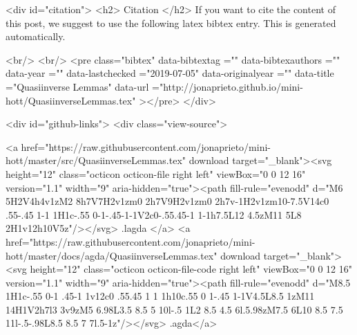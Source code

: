   
  <div id="citation">
  <h2> Citation </h2>
  If you want to cite the content of this post,
  we suggest to use the following latex bibtex entry.
  This is generated automatically.

  <br/>
  <br/>
  <pre class="bibtex"
       data-bibtextag =""
       data-bibtexauthors =""
       data-year =""
       data-lastchecked ="2019-07-05"
       data-originalyear =""
       data-title ="Quasiinverse Lemmas"
       data-url ="http://jonaprieto.github.io/mini-hott/QuasiinverseLemmas.tex"
  ></pre>
  </div>
  

  <div id="github-links">
    <div class="view-source">
      
        <a href="https://raw.githubusercontent.com/jonaprieto/mini-hott/master/src/QuasiinverseLemmas.tex" download target="_blank"><svg height="12" class="octicon octicon-file right left" viewBox="0 0 12 16" version="1.1" width="9" aria-hidden="true"><path fill-rule="evenodd" d="M6 5H2V4h4v1zM2 8h7V7H2v1zm0 2h7V9H2v1zm0 2h7v-1H2v1zm10-7.5V14c0 .55-.45 1-1 1H1c-.55 0-1-.45-1-1V2c0-.55.45-1 1-1h7.5L12 4.5zM11 5L8 2H1v12h10V5z"/></svg> .lagda </a>
        <a href="https://raw.githubusercontent.com/jonaprieto/mini-hott/master/docs/agda/QuasiinverseLemmas.tex" download target="_blank"><svg height="12" class="octicon octicon-file-code right left" viewBox="0 0 12 16" version="1.1" width="9" aria-hidden="true"><path fill-rule="evenodd" d="M8.5 1H1c-.55 0-1 .45-1 1v12c0 .55.45 1 1 1h10c.55 0 1-.45 1-1V4.5L8.5 1zM11 14H1V2h7l3 3v9zM5 6.98L3.5 8.5 5 10l-.5 1L2 8.5 4.5 6l.5.98zM7.5 6L10 8.5 7.5 11l-.5-.98L8.5 8.5 7 7l.5-1z"/></svg> .agda</a>
      
